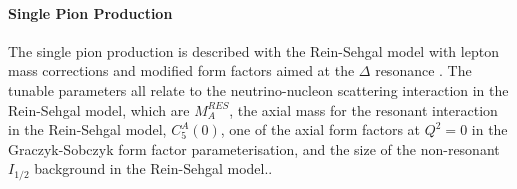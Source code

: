 \paragraph{Single Pion Production}
The single pion production is described with the Rein-Sehgal model\cite{Rein_Sehgal, Rein_Angular} with lepton mass corrections \cite{Kuzmin_MassEffect,Wroclaw_MassEffect,Berger_Sehgal_MassEffect} and modified form factors aimed at the $\Delta$ resonance \cite{Wroclaw_CC1pi_2014,Wroclaw_CC1pi_2009,Wroclaw_CC1pi_theory}. The tunable parameters all relate to the neutrino-nucleon scattering interaction in the Rein-Sehgal model, which are $M_A^{RES}$, the axial mass for the resonant interaction in the Rein-Sehgal model, $C_5^A(0)$, one of the axial form factors at $Q^2=0$ in the Graczyk-Sobczyk form factor parameterisation, and the size of the non-resonant $I_{1/2}$ background in the Rein-Sehgal model.. 

